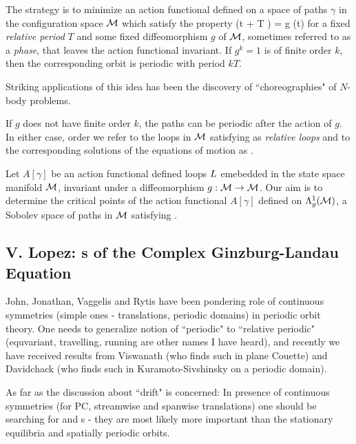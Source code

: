 The strategy
is to minimize an action functional defined on a space of paths $\gamma$ in the
configuration space ${\cal M}$ which satisfy the property
\beq
                               \gamma (t + T ) = g \cdot \gamma (t)                       
\label{McC1}
\eeq
for a fixed {\em relative period} $T$ and some fixed diffeomorphism $g$ of ${\cal M}$, 
sometimes referred to as a {\em phase}, that leaves the 
action functional invariant. If $g^k=1$ is of finite order
$k$, then the corresponding orbit is periodic with period $k T$. 

Striking applications of this idea has been the discovery
of ``choreographies" of $N$-body problems.

If $g$ does not have finite order $k$, the
paths can be periodic after the action of $g$. 
In either case, order we refer to the loops
in ${\cal M}$ satisfying  as 
{\em relative loops} and
to the corresponding solutions of the equations of motion
as {\em \rpo}. 

    Let $A[\gamma]$ be an action functional defined loops $L$
emebedded in the state space manifold ${\cal M}$, invariant
under a diffeomorphism $g : {\cal M} \to{\cal M}$. Our aim is to determine
the critical points of the action functional
$ %
	A[\gamma]
$ %
defined on $\Lambda_g^1({\cal M})$, a Sobolev space of paths in ${\cal M}$ satisfying 
.


\subsection{V. Lopez: 
	    {\Rpo s} of the Complex Ginzburg-Landau Equation}

        John, Jonathan, Vaggelis and Rytis have been pondering role of
continuous symmetries (simple ones - translations, periodic domains) in
periodic orbit theory. One needs to
generalize notion of ``periodic" to ``relative periodic" (equvariant,
travelling, running are other names I have heard), and recently
we have received results from Viswanath (who finds such in plane Couette)
and Davidchack (who finds such in Kuramoto-Sivshinsky on a periodic
domain).

As far as the discussion about ``drift" is concerned:
In presence of continuous symmetries (for PC, streamwise and
spanwise translations) one should be searching for 
{\reqva} and 
{\rpo s} - they are most likely more important than
the stationary equilibria and spatially periodic orbits. 


